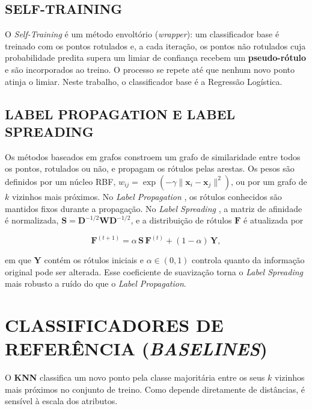 \subsection{SELF-TRAINING}

O \textit{Self-Training} \citep{yarowsky1995unsupervised} é um método envoltório (\textit{wrapper}): um classificador base é treinado com os pontos rotulados e, a cada iteração, os pontos não rotulados cuja probabilidade predita supera um limiar de confiança recebem um \textbf{pseudo-rótulo} e são incorporados ao treino. O processo se repete até que nenhum novo ponto atinja o limiar. Neste trabalho, o classificador base é a Regressão Logística.

\subsection{LABEL PROPAGATION E LABEL SPREADING}

Os métodos baseados em grafos constroem um grafo de similaridade entre todos os pontos, rotulados ou não, e propagam os rótulos pelas arestas. Os pesos são definidos por um núcleo RBF, $w_{ij} = \exp(-\gamma \lVert \mathbf{x}_i - \mathbf{x}_j \rVert^2)$, ou por um grafo de $k$ vizinhos mais próximos. No \textit{Label Propagation} \citep{zhu2002learning}, os rótulos conhecidos são mantidos fixos durante a propagação. No \textit{Label Spreading} \citep{zhou2004learning}, a matriz de afinidade é normalizada, $\mathbf{S} = \mathbf{D}^{-1/2}\mathbf{W}\mathbf{D}^{-1/2}$, e a distribuição de rótulos $\mathbf{F}$ é atualizada por

\begin{equation}
\mathbf{F}^{(t+1)} = \alpha\,\mathbf{S}\,\mathbf{F}^{(t)} + (1-\alpha)\,\mathbf{Y},
\label{eq:label_spreading}
\end{equation}

\noindent em que $\mathbf{Y}$ contém os rótulos iniciais e $\alpha \in (0,1)$ controla quanto da informação original pode ser alterada. Esse coeficiente de suavização torna o \textit{Label Spreading} mais robusto a ruído do que o \textit{Label Propagation}.

\section{CLASSIFICADORES DE REFERÊNCIA (\textit{BASELINES})}

O \textbf{KNN} classifica um novo ponto pela classe majoritária entre os seus $k$ vizinhos mais próximos no conjunto de treino. Como depende diretamente de distâncias, é sensível à escala dos atributos.

